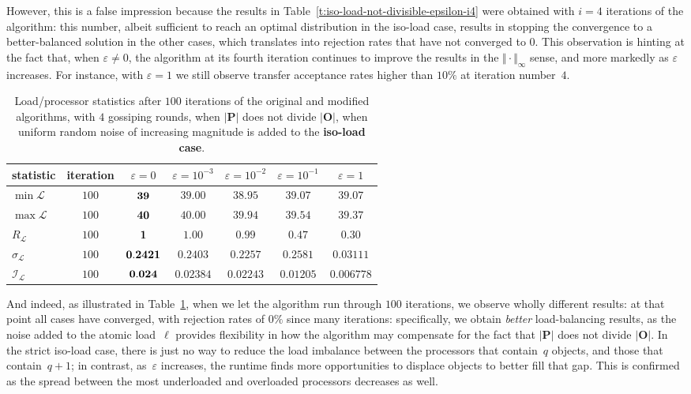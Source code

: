 However, this is a false impression because the results in
Table~\ref{t:iso-load-not-divisible-epsilon-i4} were obtained with
$i=4$ iterations of the algorithm: this
number, albeit sufficient to reach an optimal distribution in the
iso-load case, results in stopping the convergence to a
better-balanced solution in the other cases, which translates into
rejection rates that have not converged to $0$.
This observation is hinting at the fact that, when $\varepsilon\neq0$,
the algorithm at its fourth iteration continues to improve the results
in the $\Vert\cdot\Vert_{\infty}$ sense, and more markedly as
$\varepsilon$ increases. 
For instance, with $\varepsilon=1$ we still observe transfer
acceptance rates higher than $10\%$ at iteration number~$4$.

\begin{table}[htb!]
\begin{center}
\begin{tabular}{lcccccc}
\hline
statistic & iteration
& $\varepsilon=0$
& $\varepsilon=10^{-3}$
& $\varepsilon=10^{-2}$
& $\varepsilon=10^{-1}$
& $\varepsilon=1$ \\
\hline\hline
$\min{\mathcal{L}}$
&$100$ &$\bf39$ &$39.00$ &$38.95$ &$39.07$ &$39.07$ \\\hline
$\max{\mathcal{L}}$
&$100$ &$\bf40$ &$40.00$ &$39.94$ &$39.54$ &$39.37$ \\\hline
$R_{\mathcal{L}}$
&$100$ &$\bf1$ &$1.00$ &$0.99$ &$0.47$ &$0.30$ \\\hline
$\sigma_{\mathcal{L}}$
&$100$ &$\bf0.2421$ &$0.2403$ &$0.2257$ &$0.2581$ &$0.03111$ \\\hline
$\mathcal{I}_\mathcal{L}$
&$100$ &$\bf0.024$ &$0.02384$ &$0.02243$ &$0.01205$ &$0.006778$ \\\hline
\end{tabular}
\end{center}
\caption{\label{t:iso-load-not-divisible-epsilon-i100}
Load/processor statistics after $100$ iterations of the
original and modified algorithms, with $4$ gossiping rounds, when
$\vert\mathbf{P}\vert$ does not divide $\vert\mathbf{O}\vert$, when
uniform random noise of increasing magnitude is added to the
\textbf{iso-load case}.}
\end{table}
And indeed, as illustrated in
Table~\ref{t:iso-load-not-divisible-epsilon-i100}, when we let the
algorithm run through $100$ iterations, we observe wholly different
results: at that point all cases have converged, with rejection rates
of $0\%$ since many iterations: specifically, we obtain \emph{better}
load-balancing results, as the noise added to the atomic load~$\ell$
provides flexibility in how the algorithm may compensate for the fact
that $\vert\mathbf{P}\vert$ does not divide $\vert\mathbf{O}\vert$.
In the strict iso-load case, there is just no way to reduce the
load imbalance between the processors that contain~$q$ objects, and
those that contain~$q+1$; in contrast, as~$\varepsilon$ increases, the
runtime finds more opportunities to displace objects to better fill
that gap. This is confirmed as the spread between the most underloaded
and overloaded processors decreases as well.

